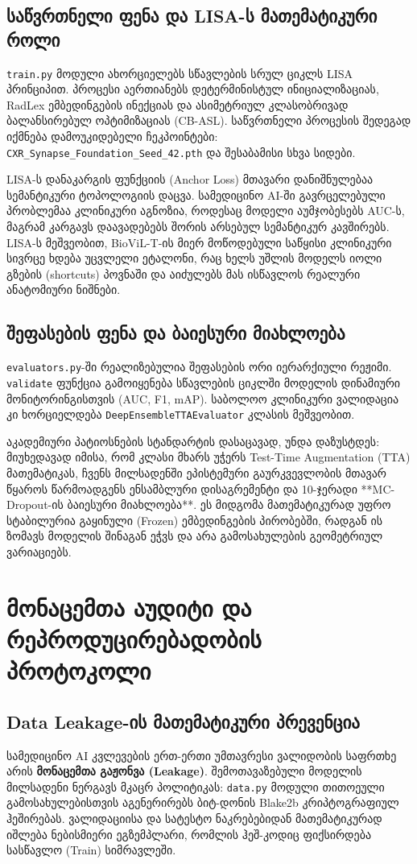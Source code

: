 \documentclass[12pt,a4paper,oneside]{report}
\begin{document}
\section{საწვრთნელი ფენა და LISA-ს მათემატიკური როლი}
\texttt{train.py} მოდული ახორციელებს სწავლების სრულ ციკლს LISA პრინციპით. პროცესი აერთიანებს დეტერმინისტულ ინიციალიზაციას, RadLex ემბედინგების ინექციას და ასიმეტრიულ კლასობრივად ბალანსირებულ ოპტიმიზაციას (CB-ASL). საწვრთნელი პროცესის შედეგად იქმნება დამოუკიდებელი ჩეკპოინტები: \texttt{CXR\_Synapse\_Foundation\_Seed\_42.pth} და შესაბამისი სხვა სიდები.

LISA-ს დანაკარგის ფუნქციის (Anchor Loss) მთავარი დანიშნულებაა სემანტიკური ტოპოლოგიის დაცვა. სამედიცინო AI-ში გავრცელებული პრობლემაა კლინიკური აგნოზია, როდესაც მოდელი აუმჯობესებს AUC-ს, მაგრამ კარგავს დაავადებებს შორის არსებულ სემანტიკურ კავშირებს. LISA-ს მეშვეობით, BioViL-T-ის მიერ მოწოდებული საწყისი კლინიკური სივრცე ხდება უცვლელი ეტალონი, რაც ხელს უშლის მოდელს იოლი გზების (shortcuts) პოვნაში და აიძულებს მას ისწავლოს რეალური ანატომიური ნიშნები.

\section{შეფასების ფენა და ბაიესური მიახლოება}
\texttt{evaluators.py}-ში რეალიზებულია შეფასების ორი იერარქიული რეჟიმი. \texttt{validate} ფუნქცია გამოიყენება სწავლების ციკლში მოდელის დინამიური მონიტორინგისთვის (AUC, F1, mAP). საბოლოო კლინიკური ვალიდაცია კი ხორციელდება \texttt{DeepEnsembleTTAEvaluator} კლასის მეშვეობით.

აკადემიური პატიოსნების სტანდარტის დასაცავად, უნდა დაზუსტდეს: მიუხედავად იმისა, რომ კლასი მხარს უჭერს Test-Time Augmentation (TTA) მათემატიკას, ჩვენს მილსადენში ეპისტემური გაურკვევლობის მთავარ წყაროს წარმოადგენს ენსამბლური დისაგრემენტი და 10-ჯერადი **MC-Dropout-ის ბაიესური მიახლოება**. ეს მიდგომა მათემატიკურად უფრო სტაბილურია გაყინული (Frozen) ემბედინგების პირობებში, რადგან ის ზომავს მოდელის შინაგან ეჭვს და არა გამოსახულების გეომეტრიულ ვარიაციებს.

\chapter{მონაცემთა აუდიტი და რეპროდუცირებადობის პროტოკოლი}

\section{Data Leakage-ის მათემატიკური პრევენცია}
სამედიცინო AI კვლევების ერთ-ერთი უმთავრესი ვალიდობის საფრთხე არის \textbf{მონაცემთა გაჟონვა (Leakage)}. შემოთავაზებული მოდელის მილსადენი ნერგავს მკაცრ პოლიტიკას: \texttt{data.py} მოდული თითოეული გამოსახულებისთვის აგენერირებს ბიტ-დონის Blake2b კრიპტოგრაფიულ ჰეშირებას. ვალიდაციისა და სატესტო ნაკრებებიდან მათემატიკურად იშლება ნებისმიერი ეგზემპლარი, რომლის ჰეშ-კოდიც ფიქსირდება სასწავლო (Train) სიმრავლეში. 
\end{document}
